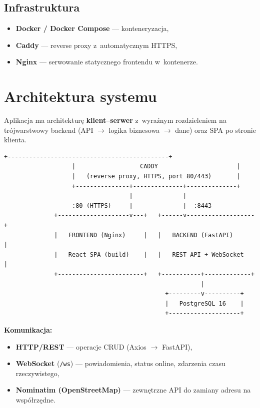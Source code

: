 \documentclass[11pt,a4paper]{article}
\begin{document}
\subsection{Infrastruktura}
\begin{itemize}[noitemsep]
    \item \textbf{Docker / Docker Compose} --- konteneryzacja,
    \item \textbf{Caddy} --- reverse proxy z~automatycznym HTTPS,
    \item \textbf{Nginx} --- serwowanie statycznego frontendu w~kontenerze.
\end{itemize}

\section{Architektura systemu}

Aplikacja ma architekturę \textbf{klient--serwer} z~wyraźnym rozdzieleniem na trójwarstwowy
backend (API $\rightarrow$ logika biznesowa $\rightarrow$ dane) oraz SPA po stronie klienta.

\begin{lstlisting}[language={}]
                   +---------------------------------------------+
                   |                  CADDY                      |
                   |   (reverse proxy, HTTPS, port 80/443)       |
                   +---------------+--------------+--------------+
                                   |              |
                   :80 (HTTPS)     |              |  :8443
              +--------------------v---+   +------v-------------------+
              |   FRONTEND (Nginx)     |   |   BACKEND (FastAPI)      |
              |   React SPA (build)    |   |   REST API + WebSocket   |
              +------------------------+   +-----------+-------------+
                                                       |
                                             +---------v----------+
                                             |   PostgreSQL 16    |
                                             +--------------------+
\end{lstlisting}

\textbf{Komunikacja:}
\begin{itemize}[noitemsep]
    \item \textbf{HTTP/REST} --- operacje CRUD (Axios $\rightarrow$ FastAPI),
    \item \textbf{WebSocket} (\texttt{/ws}) --- powiadomienia, status online, zdarzenia
          czasu rzeczywistego,
    \item \textbf{Nominatim (OpenStreetMap)} --- zewnętrzne API do zamiany adresu na
          współrzędne.
\end{itemize}
\end{document}
